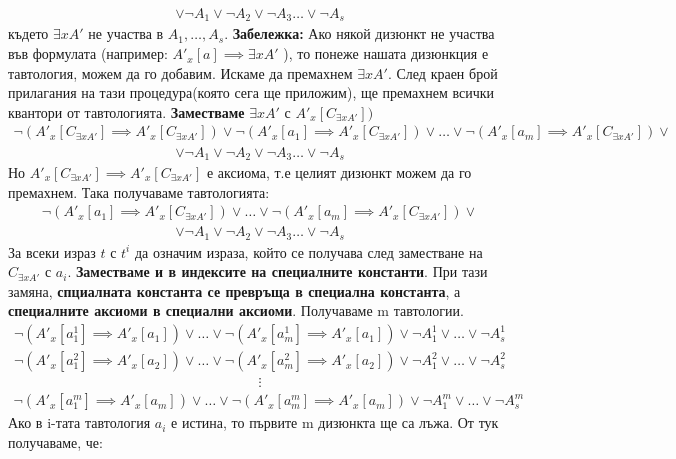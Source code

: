 \documentclass[french]{article}
\begin{document}
\begin{align*}
\lor \neg A_1 \lor \neg A_2 \lor \neg A_3 \dots \lor \neg A_s
\end{align*}
където $\exists x A'$ не участва в $A_1, \dots, A_s$. 
\newline
\textbf{Забележка:} Ако някой дизюнкт не участва във формулата \newline (например: $A'_x[a] \implies \exists x A'$ ), то понеже нашата дизюнкция е тавтология, можем да го добавим. \newline
Искаме да премахнем $\exists x A'$. След краен брой прилагания на тази процедура(която сега ще приложим), ще премахнем всички квантори от тавтологията. \newline \newline
\textbf{Заместваме} $\exists x A'$ с  $A'_x[C_{\exists x A'}])$
\begin{align*}
\neg ( A'_x[C_{\exists x A'}] \implies A'_x[C_{\exists x A'}]) \lor 	\neg (A'_x[a_1] \implies A'_x[C_{\exists x A'}]) \lor \dots 	\lor \neg(A'_x[a_m] \implies A'_x[C_{\exists x A'}])  \lor 
\end{align*}
\begin{align*}
\lor \neg A_1 \lor \neg A_2 \lor \neg A_3 \dots \lor \neg A_s
\end{align*}
Но $A'_x[C_{\exists x A'}] \implies A'_x[C_{\exists x A'}]$ е аксиома, т.е целият дизюнкт можем да го премахнем. Така получаваме тавтологията:
\begin{align*}\neg (A'_x[a_1] \implies A'_x[C_{\exists x A'}]) \lor \dots 	\lor \neg(A'_x[a_m] \implies A'_x[C_{\exists x A'}])  \lor 
\end{align*}
\begin{align*}
\lor \neg A_1 \lor \neg A_2 \lor \neg A_3 \dots \lor \neg A_s
\end{align*}
За всеки израз $t$ с $t^i$ да означим израза, който се получава след заместване на $C_{\exists x A'}$ с $a_i$. \textbf{Заместваме и в индексите на специалните константи}. \newline
При тази замяна, \textbf{спциалната константа се превръща в специална константа}, а \textbf{специалните аксиоми в специални аксиоми}. \newline
Получаваме m тавтологии.
\begin{align*}
\neg (A'_x[a_1^1] \implies A'_x[a_1]) \lor \dots 	\lor \neg(A'_x[a_m^1] \implies A'_x[a_1])  \lor \neg A_1^1 \lor  \dots \lor  \neg A_s^1
\end{align*}
\begin{align*}
\neg (A'_x[a_1^2] \implies A'_x[a_2]) \lor \dots 	\lor \neg(A'_x[a_m^2] \implies A'_x[a_2])  \lor \neg A_1^2 \lor \dots \lor \neg A_s^2
\end{align*}
\begin{align*}
\vdots
\end{align*}
\begin{align*}
\neg (A'_x[a_1^m] \implies A'_x[a_m]) \lor \dots 	\lor \neg(A'_x[a_m^m] \implies A'_x[a_m])  \lor \neg A_1^m \lor  \dots \lor  \neg A_s^m
\end{align*}
Ако в i-тата тавтология $a_i$ е истина, то първите m дизюнкта ще са лъжа. От тук получаваме, че:
\end{document}
